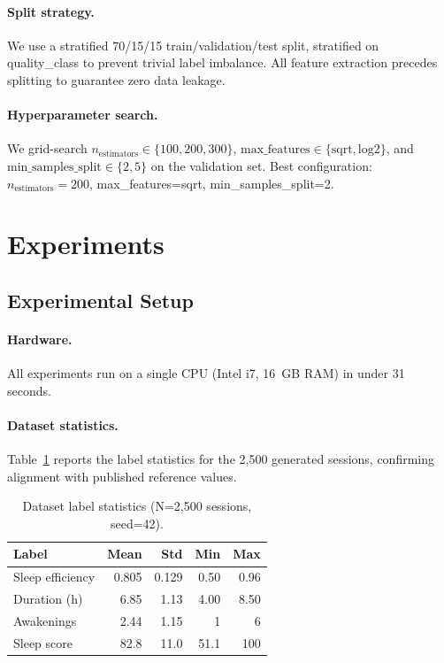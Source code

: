 \documentclass[11pt,a4paper,twocolumn]{article}
\begin{document}
\paragraph{Split strategy.}
We use a stratified 70/15/15 train/validation/test split, stratified on
quality\_class to prevent trivial label imbalance.
All feature extraction precedes splitting to guarantee zero data leakage.

\paragraph{Hyperparameter search.}
We grid-search $n_\text{estimators} \in \{100, 200, 300\}$,
$\text{max\_features} \in \{\text{sqrt}, \text{log2}\}$, and
$\text{min\_samples\_split} \in \{2, 5\}$ on the validation set.
Best configuration: $n_\text{estimators}=200$, max\_features=sqrt,
min\_samples\_split=2.

\section{Experiments}
\label{sec:experiments}

\subsection{Experimental Setup}

\paragraph{Hardware.}
All experiments run on a single CPU (Intel i7, 16~GB RAM) in under 31 seconds.

\paragraph{Dataset statistics.}
Table~\ref{tab:dataset} reports the label statistics for the 2,500 generated
sessions, confirming alignment with published reference values.

\begin{table}[h]
  \centering
  \small
  \caption{Dataset label statistics (N=2,500 sessions, seed=42).}
  \label{tab:dataset}
  \begin{tabular}{lrrrr}
    \toprule
    Label & Mean & Std & Min & Max \\
    \midrule
    Sleep efficiency  & 0.805 & 0.129 & 0.50 & 0.96 \\
    Duration (h)      & 6.85  & 1.13  & 4.00 & 8.50 \\
    Awakenings        & 2.44  & 1.15  & 1    & 6    \\
    Sleep score       & 82.8  & 11.0  & 51.1 & 100  \\
    \bottomrule
  \end{tabular}
\end{table}
\end{document}
